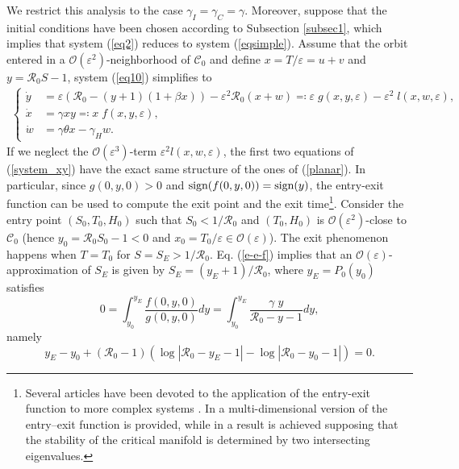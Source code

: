 \documentclass[11pt,reqno]{amsart}
\theoremstyle{boldremark}
\begin{document}
We restrict this analysis to the case $\gamma_I=\gamma_C=\gamma$. Moreover, suppose that the initial conditions have been chosen according to Subsection \ref{subsec1}, which implies that system (\ref{eq2}) reduces to system (\ref{eqsimple}). Assume that the orbit entered in a $\mathcal{O}(\varepsilon^2)$-neighborhood of $\mathcal{C}_0$ and define $x=T/\varepsilon=u+v$ and $y=\mathcal{R}_0 S-1$, system (\ref{eq10}) simplifies to 
\begin{align} \label{system_xy}
\left\{
\begin{aligned}
    \dot{y} &= \varepsilon \left(\mathcal{R}_0-(y+1)\left(1+\beta x\right)\right) - \varepsilon^2 \mathcal{R}_0 (x+w) \eqqcolon \varepsilon \; g(x,y,\varepsilon) - \varepsilon^2 \; l(x,w,\varepsilon),\\
    \dot{x} &= \gamma x y \eqqcolon x \; f(x,y,\varepsilon),\\
    \dot{w} &= \gamma \theta x - \gamma_H w. 
\end{aligned}
\right.
\end{align}
If we neglect the $\mathcal{O}(\varepsilon^3)$-term $\varepsilon^2 l(x,w,\varepsilon)$, the first two equations of (\ref{system_xy}) have the exact same structure of the ones of (\ref{planar}). In particular, since $g(0,y,0)>0$ and $\textnormal{sign} (f(0,y,0))=\textnormal{sign}(y)$, the entry-exit function can be used to compute the exit point and the exit time\footnote[2]{Several articles have been devoted to the application of the entry-exit function to more complex systems \cite{37,38}. In \cite{39} a multi-dimensional version of the entry–exit function is provided, while in \cite{36} a result is achieved supposing that the stability of the critical manifold is determined by two intersecting eigenvalues.}. Consider the entry point $(S_0, T_0, H_0)$ such that $S_0<1/\mathcal{R}_0$ and $(T_0, H_0)$ is $\mathcal{O}(\varepsilon^2)$-close to $\mathcal{C}_0$ (hence $y_0=\mathcal{R}_0 S_0-1<0$ and $x_0 = T_0/\varepsilon \in \mathcal{O}(\varepsilon)$). The exit phenomenon happens when $T=T_0$ for $S=S_E>1/\mathcal{R}_0$. Eq. (\ref{e-e-f}) implies that an $\mathcal{O}(\varepsilon)$-approximation of $S_E$ is given by $S_E=(y_E+1)/\mathcal{R}_0$, where $y_E=P_0(y_0)$ satisfies
\begin{equation} \label{eq990}
    0 = \int_{y_0}^{y_E} \frac{f(0,y,0)}{g(0,y,0)} dy = \int_{y_0}^{y_E} \frac{\gamma \; y}{\mathcal{R}_0-y-1} dy, 
\end{equation}
namely 
\begin{equation} \label{eq999}
    y_E - y_0 +(\mathcal{R}_0 -1) \left( \log|\mathcal{R}_0-y_E-1|-\log|\mathcal{R}_0-y_0-1| \right)=0. 
\end{equation}
\end{document}
